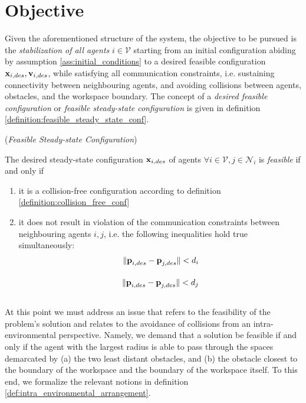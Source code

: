 \section{Objective}
\label{sec:objective}

Given the aforementioned structure of the system, the objective to be
pursued is the \textit{stabilization of all agents} $i \in \mathcal{V}$ starting
from an initial configuration abiding by assumption
\eqref{ass:initial_conditions} to a desired feasible configuration
$\bm{\mathbf{x}}_{i,des}, \bm{\mathbf{v}}_{i,des}$, while
satisfying all communication constraints, i.e. sustaining connectivity between
neighbouring agents, and avoiding collisions between agents, obstacles, and the
workspace boundary. The concept of a \textit{desired feasible configuration}
or \textit{feasible steady-state configuration} is given in definition
\eqref{definition:feasible_steady_state_conf}.\\[1ex]

\begin{bw_box}
\begin{definition} (\textit{Feasible Steady-state Configuration})
\label{definition:feasible_steady_state_conf}

The desired steady-state configuration $\bm{\mathbf{x}}_{i,des}$ of agents
$\forall i \in \mathcal{V}, j \in \mathcal{N}_i$ is \textit{feasible} if and
only if
\begin{enumerate}
  \item it is a collision-free configuration according to definition
    \eqref{definition:collision_free_conf}
  \item it does not result in violation of the communication constraints
    between neighbouring agents $i,j$, i.e. the following inequalities hold
    true simultaneously:
    \begin{align}
      \|\bm{\mathbf{p}}_{i,des} - \bm{\mathbf{p}}_{j,des}\| < d_i \\[2.5ex]
      \|\bm{\mathbf{p}}_{i,des} - \bm{\mathbf{p}}_{j,des}\| < d_j \\[2.5ex]
    \end{align}
\end{enumerate}

\end{definition}
\end{bw_box}

At this point we must address an issue that refers to the feasibility of the
problem's solution and relates to the avoidance of collisions from an
intra-environmental perspective. Namely, we demand that a solution be feasible
if and only if the agent with the largest radius is able to pass through the
spaces demarcated by (a) the two least distant obstacles, and (b) the obstacle
closest to the boundary of the workspace and the boundary of the workspace
itself. To this end, we formalize the relevant notions in definition
\eqref{def:intra_environmental_arrangement}.\\[1ex]

